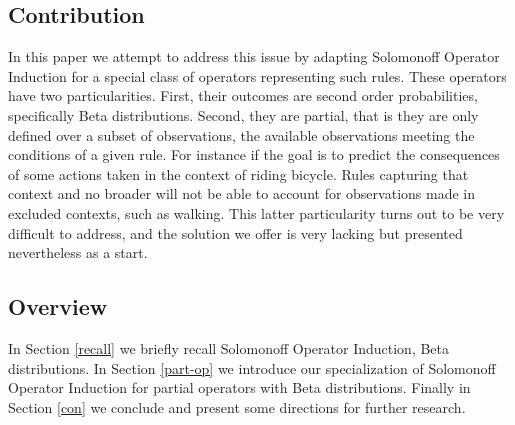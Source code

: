 \documentclass[runningheads]{llncs}
\begin{document}
\subsection{Contribution}

In this paper we attempt to address this issue by adapting Solomonoff
Operator Induction \cite{Solomonoff08Three} for a special class of
operators representing such rules. These operators have two
particularities.  First, their outcomes are second order
probabilities, specifically Beta distributions. Second, they are
partial, that is they are only defined over a subset of observations,
the available observations meeting the conditions of a given rule. For
instance if the goal is to predict the consequences of some actions
taken in the context of riding bicycle. Rules capturing that context
and no broader will not be able to account for observations made in
excluded contexts, such as walking. This latter particularity turns
out to be very difficult to address, and the solution we offer is very
lacking but presented nevertheless as a start.


\subsection{Overview}

In Section \ref{recall} we briefly recall Solomonoff Operator
Induction, Beta distributions. In Section \ref{part-op} we introduce
our specialization of Solomonoff Operator Induction for partial
operators with Beta distributions. Finally in Section \ref{con} we
conclude and present some directions for further research.

\end{document}
